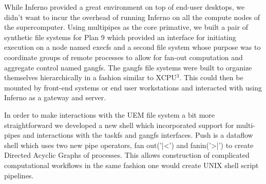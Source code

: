 While Inferno provided a great environment on top of end-user desktops, we didn't want
to incur the overhead of running Inferno on all the compute nodes of the supercomputer.
Using multipipes as the core primative, we built a pair of synthetic file systems for 
Plan 9 which provided an interface for initiating execution on a node named execfs and
a second file system whose purpose was to coordinate groups of remote processes to allow
for fan-out computation and aggregate control named gangfs.  The gangfs file systems
were built to organize themselves hierarchically in a fashion similar to XCPU$^3$.  This
could then be mounted by front-end systems or end user workstations and interacted with
using Inferno as a gateway and server.

In order to make interactions with the UEM file system a bit more straightforward
we developed a new shell which incorporated support for multi-pipes and interactions
with the taskfs and gangfs interfaces.  
Push is a dataflow shell which uses two new pipe operators, fan out('|<') and 
fanin('>|') to create Directed Acyclic Graphs of processes.
This allows construction of complicated computational workflows 
in the same fashion one would create UNIX shell script pipelines.
